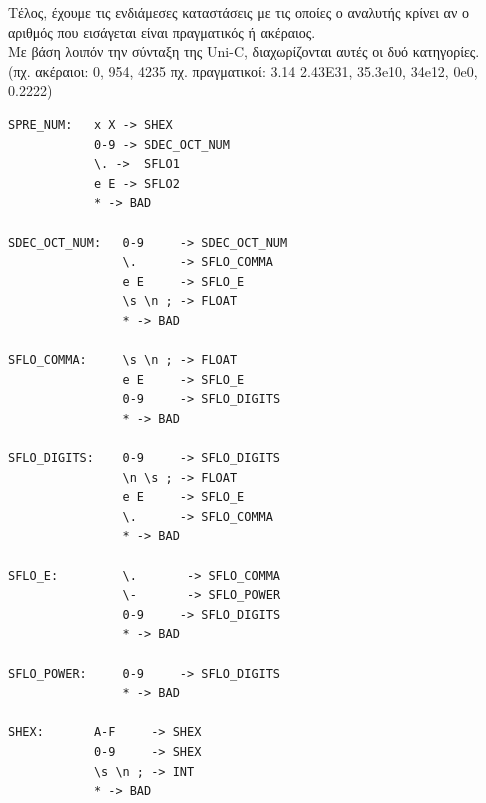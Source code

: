 \documentclass[14pt]{extarticle}
\begin{document}
\clearpage
Τέλος, έχουμε τις ενδιάμεσες καταστάσεις με τις οποίες ο αναλυτής κρίνει αν ο αριθμός που εισάγεται είναι πραγματικός ή ακέραιος.
\\
Με βάση λοιπόν την σύνταξη της \textlatin{Uni-C}, διαχωρίζονται αυτές οι δυό κατηγορίες.
\\
(πχ. ακέραιοι: 0, 954, 4235 πχ. πραγματικοί: 3.14 2.43Ε31, 35.3\textlatin{e}10, 34\textlatin{e}12, 0\textlatin{e}0, 0.2222)  
    \begin{lstlisting}
SPRE_NUM:   x X -> SHEX
            0-9 -> SDEC_OCT_NUM
            \. ->  SFLO1
            e E -> SFLO2
            * -> BAD
            
SDEC_OCT_NUM:   0-9     -> SDEC_OCT_NUM
                \.      -> SFLO_COMMA
                e E     -> SFLO_E
                \s \n ; -> FLOAT
                * -> BAD

SFLO_COMMA:     \s \n ; -> FLOAT
                e E     -> SFLO_E
                0-9     -> SFLO_DIGITS
                * -> BAD

SFLO_DIGITS:    0-9     -> SFLO_DIGITS
                \n \s ; -> FLOAT
                e E     -> SFLO_E
                \.      -> SFLO_COMMA
                * -> BAD

SFLO_E:         \.       -> SFLO_COMMA
                \-       -> SFLO_POWER 
                0-9     -> SFLO_DIGITS
                * -> BAD

SFLO_POWER:     0-9     -> SFLO_DIGITS
                * -> BAD
    
SHEX:       A-F     -> SHEX
            0-9     -> SHEX
            \s \n ; -> INT
            * -> BAD
    \end{lstlisting}


\clearpage
\end{document}
